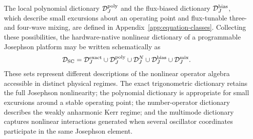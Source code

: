 \documentclass[pra,twocolumn,superscriptaddress,nofootinbib,floatfix]{revtex4-2}
\theoremstyle{remark}
\newcommand{\revcolor}{\color{blue}}
\DeclareRobustCommand{\rev}[1]{{\revcolor #1}}
\begin{document}
\rev{The local polynomial dictionary \(\mathcal D_J^{\rm poly}\) and the flux-biased dictionary \(\mathcal D_J^{\rm bias}\), which describe small excursions about an operating point and flux-tunable three- and four-wave mixing, are defined in Appendix~\ref{app:equation-classes}.} Collecting these possibilities, the hardware-native nonlinear dictionary of a programmable Josephson platform may be written schematically as
\begin{align}
\mathcal D_{\rm SC}=\mathcal D_{J}^{\rm exact}\cup\mathcal D_{J}^{\rm poly}\cup\mathcal D_{J}^{N}\cup\mathcal D_{J}^{\rm bias}\cup\mathcal D_{J}^{\rm mix}.
\label{eq:complete-superconducting-dictionary}
\end{align}
These sets represent different descriptions of the nonlinear operator algebra accessible in distinct physical regimes. The exact trigonometric dictionary retains the full Josephson nonlinearity; the polynomial dictionary is appropriate for small excursions around a stable operating point; the number-operator dictionary describes the weakly anharmonic Kerr regime; and the multimode dictionary captures nonlinear interactions generated when several oscillator coordinates participate in the same Josephson element.
\end{document}
